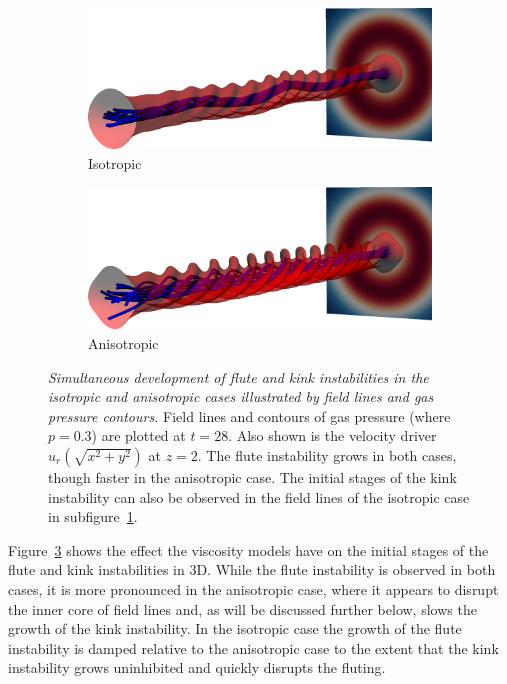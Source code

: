 \documentclass[fleqn,usenatbib]{mnras}
\newcommand{\rev}[1]{{\color{red} {#1}}}
\newcommand{\mycaption}[2]{\caption[#1]{\emph{#1} #2}}
\begin{document}
\begin{figure}
  \centering
    \begin{subfigure}{0.49\textwidth}
      \includegraphics[width=\linewidth]{field_line_plots/cropped/v-4r-4-isotropic_0014_cropped.png}
      \caption{Isotropic}
      \label{fig:field_line_plots_iso}
    \end{subfigure}
    \hfill
    \begin{subfigure}{0.49\textwidth}
      \includegraphics[width=\linewidth]{field_line_plots/cropped/v-4r-4-switching_0014_cropped.png}
      \caption{Anisotropic}
      \label{fig:field_line_plots_swi}
    \end{subfigure}
\mycaption{Simultaneous development of flute and kink instabilities in the
isotropic and anisotropic cases illustrated by field lines and
\rev{gas} pressure
contours.}{Field lines and contours of \rev{gas} pressure (where $p=0.3$) are plotted at
$t=28$. Also shown is the velocity driver $u_r(\sqrt{x^2+y^2})$ at $z=2$. The
flute instability grows in both cases, though faster in the anisotropic case.
The initial stages of the kink instability can also be observed in the field
lines of the isotropic case in subfigure~\ref{fig:field_line_plots_iso}.}
\label{fig:kink_field_line_plots}%
\end{figure}

Figure~\ref{fig:kink_field_line_plots} shows the effect the viscosity models
have on the initial stages of the flute and kink instabilities in 3D. While the
flute instability is observed in both cases, \rev{it is more
  pronounced in the anisotropic case, where it} appears to disrupt the inner
core of field lines and, as will be discussed further below, slows the growth
of the kink instability. In the isotropic case the \rev{growth of the flute
instability is damped relative to the anisotropic case} to the extent that the
kink instability grows uninhibited and quickly disrupts the fluting. 
\end{document}
